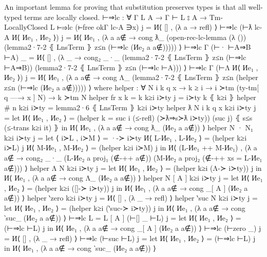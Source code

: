 \documentclass[logo,bsc,singlespacing,parskip,online]{infthesis}
\renewenvironment{code}{\mintedcopy[breaklines,breaksymbolleft=\;]{agda}}{\endmintedcopy}
\begin{document}
An important lemma for proving that substitution preserves types is that all well-typed terms are
locally closed.
\begin{code}
  ⊢⇒lc : ∀ {Γ L A} → Γ ⊢ L ⦂ A → Tm-LocallyClosed L
  ⊢⇒lc (⊢free okΓ lc-A ∋x) j = И⟨ [] , (λ a → refl) ⟩
  ⊢⇒lc (⊢ƛ lc-A И⟨ Иe₁ , Иe₂ ⟩) j = И⟨ Иe₁ , (λ a {a∉} → cong ƛ_
    (open-rec-lc-lemma
      (λ ())
      (lemma2·7-2 ⦃ LnsTerm ⦄ z≤n (⊢⇒lc (Иe₂ a {a∉}))))) ⟩
  ⊢⇒lc {Γ} (⊢· ⊢A⇒B ⊢A) _ = И⟨ [] , (λ _ → cong₂ _·_
    (lemma2·7-2 ⦃ LnsTerm ⦄ z≤n (⊢⇒lc ⊢A⇒B))
    (lemma2·7-2 ⦃ LnsTerm ⦄ z≤n (⊢⇒lc ⊢A))) ⟩
  ⊢⇒lc {Γ} (⊢Λ И⟨ Иe₁ , Иe₂ ⟩) j = И⟨ Иe₁ , (λ a {a∉} → cong Λ_ (lemma2·7-2 ⦃ LnsTerm ⦄ z≤n (helper z≤n (⊢⇒lc (Иe₂ a {a∉}))))) ⟩
    where
      helper : ∀ {N i k q x}
        → k ≥ i
        → i ≻tm (ty-tm[ q —→ x ] N)
        → k ≻tm N
      helper {fr x} {k = k} k≥i i≻ty j = i≻ty k ⦃ k≥i ⦄
      helper {# n} k≥i i≻ty = lemma2·6 ⦃ LnsTerm ⦄ k≥i i≻ty
      helper {ƛ N} {i} {k} {q} {x} k≥i i≻ty j =
        let И⟨ Иe₁ , Иe₂ ⟩ = (helper {k = suc i} (≤-refl) (≻ƛ⇒s≻ƛ i≻ty)) (suc j) ⦃ s≤s (≤-trans k≥i it) ⦄
        in И⟨ Иe₁ , (λ a {a∉} → cong ƛ_ (Иe₂ a {a∉})) ⟩
      helper {N · N₁} k≥i i≻ty j =
        let ⟨ i≻L  , i≻M ⟩ = ·-≻ i≻ty
            И⟨ L-Иe₁ , L-Иe₂ ⟩ = (helper k≥i i≻L) j
            И⟨ M-Иe₁ , M-Иe₂ ⟩ = (helper k≥i i≻M) j
          in И⟨ (L-Иe₁ ++ M-Иe₁) , (λ a {a∉} → cong₂ _·_
            (L-Иe₂ a {proj₁ (∉-++ a∉)})
            (M-Иe₂ a {proj₂ (∉-++ {xs = L-Иe₁} a∉)})) ⟩
      helper {Λ N} k≥i i≻ty j =
        let И⟨ Иe₁ , Иe₂ ⟩ = (helper k≥i (Λ-≻ i≻ty)) j
        in И⟨ Иe₁ , (λ a {a∉} → cong Λ_ (Иe₂ a {a∉})) ⟩
      helper {N [ A ]} k≥i i≻ty j = 
        let И⟨ Иe₁ , Иe₂ ⟩ = (helper k≥i ([]-≻ i≻ty)) j
        in И⟨ Иe₁ , (λ a {a∉} → cong _[ A ] (Иe₂ a {a∉})) ⟩
      helper {‵zero} k≥i i≻ty j = И⟨ [] , (λ _ → refl) ⟩
      helper {‵suc N} k≥i i≻ty j = 
        let И⟨ Иe₁ , Иe₂ ⟩ = (helper k≥i (‵suc-≻ i≻ty)) j
        in И⟨ Иe₁ , (λ a {a∉} → cong ‵suc_ (Иe₂ a {a∉})) ⟩
  ⊢⇒lc {L = L [ A ]} (⊢[] _ ⊢L) j =
    let И⟨ Иe₁ , Иe₂ ⟩ = (⊢⇒lc ⊢L) j
    in И⟨ Иe₁ , (λ a {a∉} → cong _[ A ]  (Иe₂ a {a∉})) ⟩
  ⊢⇒lc (⊢zero _) j = И⟨ [] , (λ _ → refl) ⟩
  ⊢⇒lc (⊢suc ⊢L) j =
    let И⟨ Иe₁ , Иe₂ ⟩ = (⊢⇒lc ⊢L) j
    in И⟨ Иe₁ , (λ a {a∉} → cong ‵suc_ (Иe₂ a {a∉})) ⟩


\end{code}
\end{document}
